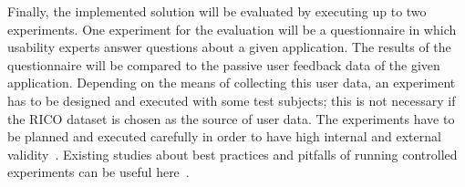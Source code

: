 Finally, the implemented solution will be evaluated by executing up to two experiments.
One experiment for the evaluation will be a questionnaire in which usability experts answer questions about a given application.
The results of the questionnaire will be compared to the passive user feedback data of the given application.
Depending on the means of collecting this user data, an experiment has to be designed and executed with some test subjects; this is not necessary if the RICO dataset is chosen as the source of user data.
The experiments have to be planned and executed carefully in order to have high internal and external validity~\cite{Huitt2010}.
Existing studies about best practices and pitfalls of running controlled experiments can be useful here~\cite{Kohavi2009}.

